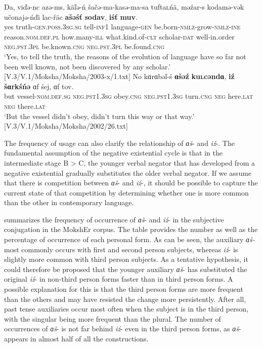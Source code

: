 \documentclass[output=paper]{langsci/langscibook}
\begin{document}
\ea\label{ex:moksha-evolution}
\gll Da, viďə-nc azə-ms, käľə-ń šačə-ma-kasə-ma-sa tufta\textsc{l}ńä, məźar-s kodamə-vək učonajə-ńďi lac-ŕäc \textbf{ašəśť} \textbf{sodav}, \textbf{iśť} \textbf{muv}.\\
yes truth-\textsc{gen.poss.3sg.sg} tell-\textsc{inf1} language-\textsc{gen} be.born-\textsc{nmlz}-grow-\textsc{nmlz-ine} reason.\textsc{nom.def.pl}  how.many-\textsc{ill}    what.kind.of-\textsc{clt} scholar-\textsc{dat} well-in.order \textsc{neg.pst.3pl} be.known.\textsc{cng} \textsc{neg.pst.3pl} be.found.\textsc{cng}\\
\glt `Yes, to tell the truth, the reasons of the evolution of language have so far not been well known, not been discovered by any scholar.' [V.3/V.1/Moksha/Moksha/2003-x/1.txt]
\z
\ea\label{ex:moksha-vessel}
\gll No kɑrɑbəľ-ś \textbf{ɑšəź} \textbf{ku\textsc{l}cəndɑ}, \textbf{iź} \textbf{šɑrkśńə} ɑf śej, ɑf tov.\\
but vessel-\textsc{nom.def.sg} \textsc{neg.pst1.3sg} obey.\textsc{cng} 
\textsc{neg.pst1.3sg} turn.\textsc{cng} \textsc{neg} here.\textsc{lat} \textsc{neg}    there.\textsc{lat}\\
\glt `But the vessel didn't obey, didn't turn this way or that way.' [V.3/V.1/Moksha/Moksha/2002/26.txt]
\z

  The frequency of usage can also clarify the relationship of \textit{ɑš}- and \textit{iź}-. The fundamental assumption of the negative existential cycle is that in the intermediate stage B > C, the younger verbal negator that has developed from a negative existential gradually substitutes the older verbal negator. If we assume that there is competition between \textit{ɑš}- and \textit{iź}-, it should be possible to capture the current state of that competition by determining whether one is more common than the other in contemporary language. 

   summarizes the frequency of occurrence of \textit{ɑš}- and \textit{iź}- in the subjective conjugation in the MokshEr corpus. The table provides the number as well as the percentage of occurrence of each personal form. As can be seen, the auxiliary \textit{ɑš-} most commonly occurs with first and second person subjects, whereas \textit{iź}- is slightly more common with third person subjects. As a tentative hypothesis, it could therefore be proposed that the younger auxiliary \textit{ɑš}- has substituted the original \textit{iź}- in non-third person forms faster than in third person forms. A possible explanation for this is that the third person forms are more frequent than the others and may have resisted the change more persistently. After all, past tense auxiliaries occur most often when the subject is in the third person, with the singular being more frequent than the plural. The number of occurrences of \textit{ɑš}- is not far behind \textit{iź}- even in the third person forms, as \textit{ɑš}- appears in almost half of all the constructions.
\end{document}
